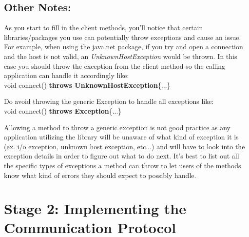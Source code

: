 \documentclass{article}
\begin{document}
\subsection*{Other Notes:}
\begin{info}
As you start to fill in the client methods, you'll notice that certain libraries/packages you use can potentially throw exceptions and cause an issue. For example, when using the java.net package, if you try and open a connection and the host is not valid, an \textit{UnknownHostException} would be thrown. In this case you should throw the exception from the client method so the calling application can handle it accordingly like:\\

\vspace{-0.2cm}
\indent void connect() \textbf{throws UnknownHostException}\{...\}\\
\vspace{-0.2cm}

\noindent Do avoid throwing the generic Exception to handle all exceptions like: \\

\vspace{-0.2cm}
\indent void connect() \textbf{throws Exception}\{...\} \\
\vspace{-0.2cm}

\noindent Allowing a method to throw a generic exception is not good practice as any application utilizing the library will be unaware of what kind of exception it is (ex. i/o exception, unknown host exception, etc...) and will have to look into the exception details in order to figure out what to do next. It's best to list out all the specific types of exceptions a method can throw to let users of the methods know what kind of errors they should expect to possibly handle.
\end{info}








\section{Stage 2: Implementing the Communication Protocol} %
\end{document}
